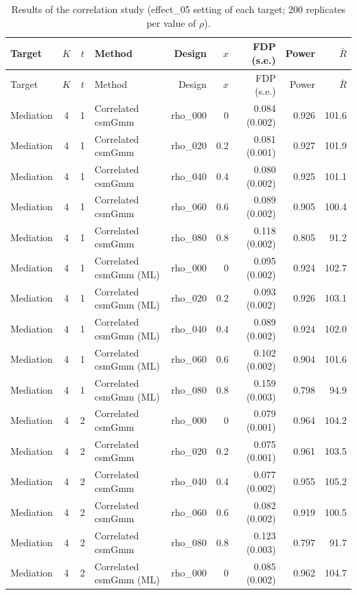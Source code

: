 \begin{longtable}{lcclrrrrr}
\caption{Results of the correlation study (effect\_05 setting of each target; 200 replicates per value of $\rho$).}\label{tab:sim-rho}\\
\toprule
Target & $K$ & $t$ & Method & Design & $x$ & FDP (s.e.) & Power & $\bar R$\\
\midrule
\endfirsthead
\toprule
Target & $K$ & $t$ & Method & Design & $x$ & FDP (s.e.) & Power & $\bar R$\\
\midrule
\endhead
Mediation & 4 & 1 & Correlated csmGmm & rho\_000 & 0 & 0.084 (0.002) & 0.926 & 101.6\\
Mediation & 4 & 1 & Correlated csmGmm & rho\_020 & 0.2 & 0.081 (0.001) & 0.927 & 101.9\\
Mediation & 4 & 1 & Correlated csmGmm & rho\_040 & 0.4 & 0.080 (0.002) & 0.925 & 101.1\\
Mediation & 4 & 1 & Correlated csmGmm & rho\_060 & 0.6 & 0.089 (0.002) & 0.905 & 100.4\\
Mediation & 4 & 1 & Correlated csmGmm & rho\_080 & 0.8 & 0.118 (0.002) & 0.805 & 91.2\\
Mediation & 4 & 1 & Correlated csmGmm (ML) & rho\_000 & 0 & 0.095 (0.002) & 0.924 & 102.7\\
Mediation & 4 & 1 & Correlated csmGmm (ML) & rho\_020 & 0.2 & 0.093 (0.002) & 0.926 & 103.1\\
Mediation & 4 & 1 & Correlated csmGmm (ML) & rho\_040 & 0.4 & 0.089 (0.002) & 0.924 & 102.0\\
Mediation & 4 & 1 & Correlated csmGmm (ML) & rho\_060 & 0.6 & 0.102 (0.002) & 0.904 & 101.6\\
Mediation & 4 & 1 & Correlated csmGmm (ML) & rho\_080 & 0.8 & 0.159 (0.003) & 0.798 & 94.9\\
Mediation & 4 & 2 & Correlated csmGmm & rho\_000 & 0 & 0.079 (0.001) & 0.964 & 104.2\\
Mediation & 4 & 2 & Correlated csmGmm & rho\_020 & 0.2 & 0.075 (0.001) & 0.961 & 103.5\\
Mediation & 4 & 2 & Correlated csmGmm & rho\_040 & 0.4 & 0.077 (0.002) & 0.955 & 105.2\\
Mediation & 4 & 2 & Correlated csmGmm & rho\_060 & 0.6 & 0.082 (0.002) & 0.919 & 100.5\\
Mediation & 4 & 2 & Correlated csmGmm & rho\_080 & 0.8 & 0.123 (0.003) & 0.797 & 91.7\\
Mediation & 4 & 2 & Correlated csmGmm (ML) & rho\_000 & 0 & 0.085 (0.002) & 0.962 & 104.7\\

\end{longtable}
